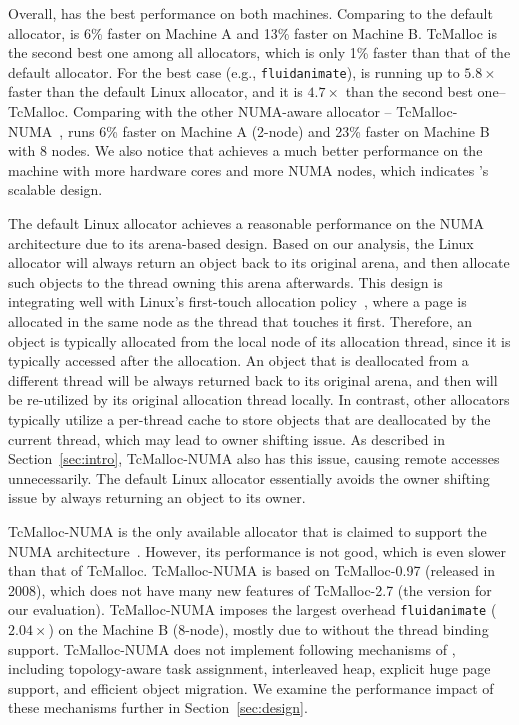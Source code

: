 Overall, \NM{} has the best performance on both machines. Comparing to the default allocator, \NM{} is 6\% faster on Machine A and 13\% faster on Machine B. TcMalloc is the second best one among all allocators, which is only 1\% faster than that of the default allocator. For the best case (e.g., \texttt{fluidanimate}), \NM{} is running up to  $5.8\times$ faster than the default Linux allocator, and it is $4.7\times$ than the second best one--TcMalloc.  Comparing with the other NUMA-aware allocator -- TcMalloc-NUMA~\cite{tcmallocnew}, \NM{} runs 6\% faster on Machine A (2-node) and 23\% faster on Machine B with 8 nodes. We also notice that \NM{} achieves a much better performance on the machine with more hardware cores and more NUMA nodes, which indicates \NM{}'s scalable design. 

The default Linux allocator achieves a reasonable performance on the NUMA architecture due to its arena-based design. Based on our analysis, the Linux allocator will always return an object back to its original arena, and then allocate such objects to the thread owning this arena afterwards. This design is integrating well with Linux's first-touch allocation policy~\cite{Lameter:2013:NO:2508834.2513149}, where a page is allocated in the same node as the thread that touches it first. Therefore, an object is typically allocated from the local node of its allocation thread, since it is typically accessed after the allocation. An object that is deallocated from a different thread will be always returned back to its original arena, and then will be re-utilized by its original allocation thread locally. In contrast, other allocators typically utilize a per-thread cache to store objects that are deallocated by the current thread, which may lead to owner shifting issue. As described in Section~\ref{sec:intro}, TcMalloc-NUMA also has this issue, causing remote accesses unnecessarily. The default Linux allocator essentially avoids the owner shifting issue by always returning an object to its owner. 

 TcMalloc-NUMA is the only available allocator that is claimed to support the NUMA architecture~\cite{tcmallocnew}. However, its performance is not good, which is even slower than that of TcMalloc. TcMalloc-NUMA is based on TcMalloc-0.97 (released in 2008), which does not have many new features of TcMalloc-2.7 (the version for our evaluation). TcMalloc-NUMA imposes the largest overhead \texttt{fluidanimate} ($2.04\times$) on the Machine B (8-node), mostly due to without the thread binding support.  TcMalloc-NUMA does not implement following mechanisms of \NM{}, including topology-aware task assignment, interleaved heap, explicit huge page support, and efficient object migration. We examine the performance impact of these mechanisms further in Section~\ref{sec:design}.    
  


